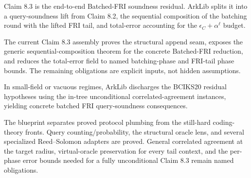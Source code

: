 \begin{definition}\label{def:batched_fri_claim83_frontier}
    Claim 8.3 is the end-to-end Batched-FRI soundness residual.  ArkLib splits it into a
    query-soundness lift from Claim 8.2, the sequential composition of the batching round with the
    lifted FRI tail, and total-error accounting for the
    $\epsilon_C + \alpha^\ell$ budget.
\end{definition}

\begin{theorem}\label{thm:batched_fri_claim83_assembly}
    The current Claim 8.3 assembly proves the structural append seam, exposes the generic
    sequential-composition theorem for the concrete Batched-FRI reduction, and reduces the
    total-error field to named batching-phase and FRI-tail phase bounds.  The remaining obligations
    are explicit inputs, not hidden assumptions.
\end{theorem}

\begin{theorem}\label{thm:batched_fri_small_field}
    In small-field or vacuous regimes, ArkLib discharges the BCIKS20 residual hypotheses using
    the in-tree unconditional correlated-agreement instances, yielding concrete batched FRI
    query-soundness consequences.
\end{theorem}

\begin{remark}\label{rem:batched_fri_status}
    The blueprint separates proved protocol plumbing from the still-hard coding-theory fronts.
    Query counting/probability, the structural oracle lens, and several specialized
    Reed--Solomon adapters are proved.  General correlated agreement at the target radius,
    virtual-oracle preservation for every tail context, and the per-phase error bounds needed for
    a fully unconditional Claim 8.3 remain named obligations.
\end{remark}
